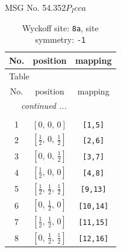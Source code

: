 \documentclass[fleqn,8pt]{jsarticle}
\begin{document}
\setcounter{MaxMatrixCols}{32}

\renewcommand{\tablename}{Table~}
\renewcommand{\figurename}{Figure~}
\begin{center}
\LARGE
MSG No. 54.352\quad$P_{I}cca$
\end{center}
\renewcommand{\arraystretch}{1.2}
\begin{longtable}{ccc}
\caption{Wyckoff site: {\tt 8a}, site symmetry: {\tt -1}}
 \\
 \hline \hline
No. & position & mapping \\ \hline \endfirsthead

\multicolumn{2}{l}{\tablename\ \thetable{}} \\
 \hline \hline
No. & position & mapping \\ \hline \endhead

 \hline \hline
\multicolumn{2}{r}{\footnotesize\it continued ...} \\ \endfoot

 \hline \hline
\multicolumn{2}{r}{} \\ \endlastfoot

1 & $\left[ 0,\, 0,\, 0 \right]$ & {\tt [1,5]} \\ \hline
2 & $\left[ \frac{1}{2},\, 0,\, \frac{1}{2} \right]$ & {\tt [2,6]} \\ \hline
3 & $\left[ 0,\, 0,\, \frac{1}{2} \right]$ & {\tt [3,7]} \\ \hline
4 & $\left[ \frac{1}{2},\, 0,\, 0 \right]$ & {\tt [4,8]} \\ \hline
5 & $\left[ \frac{1}{2},\, \frac{1}{2},\, \frac{1}{2} \right]$ & {\tt [9,13]} \\ \hline
6 & $\left[ 0,\, \frac{1}{2},\, 0 \right]$ & {\tt [10,14]} \\ \hline
7 & $\left[ \frac{1}{2},\, \frac{1}{2},\, 0 \right]$ & {\tt [11,15]} \\ \hline
8 & $\left[ 0,\, \frac{1}{2},\, \frac{1}{2} \right]$ & {\tt [12,16]} \\
\end{longtable}
\renewcommand{\arraystretch}{1.2}
\end{document}
